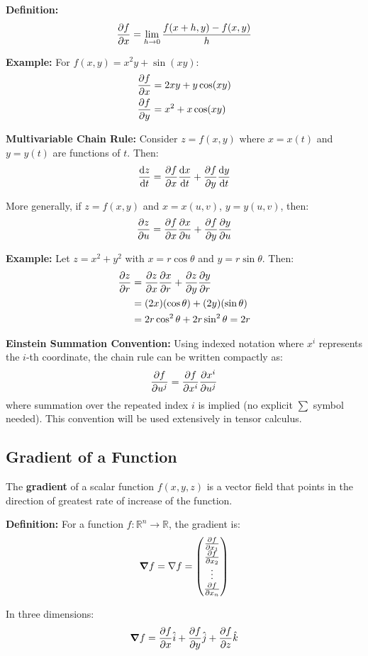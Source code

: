 \textbf{Definition:}
\[
\pdv{f}{x} = \lim_{h \to 0} \frac{f(x+h, y) - f(x, y)}{h}
\]

\textbf{Example:} For $f(x, y) = x^2y + \sin(xy)$:
\begin{align*}
\pdv{f}{x} &= 2xy + y\cos(xy) \\
\pdv{f}{y} &= x^2 + x\cos(xy)
\end{align*}

\textbf{Multivariable Chain Rule:} Consider $z = f(x, y)$ where $x = x(t)$ and $y = y(t)$ are functions of $t$. Then:
\[
\dv{z}{t} = \pdv{f}{x}\dv{x}{t} + \pdv{f}{y}\dv{y}{t}
\]

More generally, if $z = f(x, y)$ and $x = x(u, v)$, $y = y(u, v)$, then:
\[
\pdv{z}{u} = \pdv{f}{x}\pdv{x}{u} + \pdv{f}{y}\pdv{y}{u}
\]

\textbf{Example:} Let $z = x^2 + y^2$ with $x = r\cos\theta$ and $y = r\sin\theta$. Then:
\begin{align*}
\pdv{z}{r} &= \pdv{z}{x}\pdv{x}{r} + \pdv{z}{y}\pdv{y}{r} \\
&= (2x)(\cos\theta) + (2y)(\sin\theta) \\
&= 2r\cos^2\theta + 2r\sin^2\theta = 2r
\end{align*}

\textbf{Einstein Summation Convention:} Using indexed notation where $x^i$ represents the $i$-th coordinate, the chain rule can be written compactly as:
\[
\pdv{f}{u^j} = \pdv{f}{x^i}\pdv{x^i}{u^j}
\]
where summation over the repeated index $i$ is implied (no explicit $\sum$ symbol needed). This convention will be used extensively in tensor calculus.

\subsection{Gradient of a Function}

The \textbf{gradient} of a scalar function $f(x, y, z)$ is a vector field that points in the direction of greatest rate of increase of the function.

\textbf{Definition:} For a function $f: \mathbb{R}^n \to \mathbb{R}$, the gradient is:
\[
\grad f = \nabla f = \begin{pmatrix} \pdv{f}{x_1} \\ \pdv{f}{x_2} \\ \vdots \\ \pdv{f}{x_n} \end{pmatrix}
\]

In three dimensions:
\[
\grad f = \pdv{f}{x}\hat{i} + \pdv{f}{y}\hat{j} + \pdv{f}{z}\hat{k}
\]


